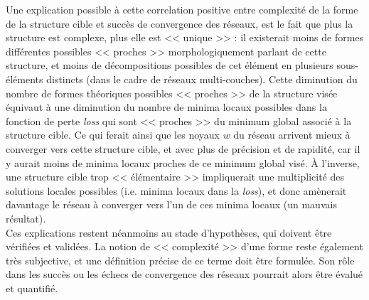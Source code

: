 \newpage

Une explication possible à cette correlation positive entre complexité de la forme de la structure cible et succès de convergence des réseaux, est le fait que plus la structure est complexe, plus elle est << unique >> : il existerait moins de formes différentes possibles << proches >> morphologiquement parlant de cette structure, et moins de décompositions possibles de cet élément en plusieurs sous-éléments distincts (dans le cadre de réseaux multi-couches). Cette diminution du nombre de formes théoriques possibles << proches >> de la structure visée équivaut à une diminution du nombre de minima locaux possibles dans la fonction de perte \textit{loss} qui sont << proches >> du minimum global associé à la structure cible. Ce qui ferait ainsi que les noyaux $w$ du réseau arrivent mieux à converger vers cette structure cible, et avec plus de précision et de rapidité, car il y aurait moins de minima locaux proches de ce minimum global visé. À l'inverse, une structure cible trop << élémentaire >> impliquerait une multiplicité des solutions locales possibles (i.e. minima locaux dans la \textit{loss}), et donc amènerait davantage le réseau à converger vers l'un de ces minima locaux (un mauvais résultat). \\

\vspace{-1.6mm}
\noindent Ces explications restent néanmoins au stade d'hypothèses, qui doivent être vérifiées et validées. La notion de << complexité >> d'une forme reste également très subjective, et une définition précise de ce terme doit être formulée. Son rôle dans les succès ou les échecs de convergence des réseaux pourrait alors être évalué et quantifié.


\vspace{1.0mm}



